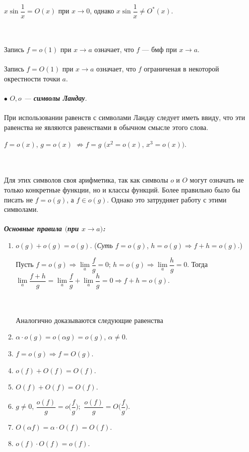 \begin{example}
	$x\sin \dfrac{1}{x} = O(x)$ при $x\to 0$, однако $x\sin \dfrac{1}{x} \ne O^*(x)$.
\end{example}\\\\
Запись $f = o(1)$ при $x\to a$ означает, что $f$ --- бмф при $x\to a$.\\\\
Запись $f = O(1)$ при $x\to a$ означает, что $f$ ограниченая  в некоторой окрестности точки $a$.\\\\
$\bullet$ \textit{$O, o$ --- \textbf{символы Ландау}.}\\\\
При использовании равенств с символами Ландау следует иметь ввиду, что эти равенства не являются равенствами в обычном смысле этого слова.\\
\begin{example}
	$f = o(x)$, $g = o(x)$ $\not \Rightarrow f = g$ $(x^2 = o(x)$, $x^3 = o(x))$.  
\end{example}\\\\
Для этих символов своя арифметика, так как символы $o$ и $O$ могут означать не только конкретные функции, но и классы функций. Более правильно было бы писать не $f= o(g)$, а $f \in o(g)$. Однако это затрудняет работу с этими символами.\\\\
\textbf{\textit{Основные правила $($при $x \to a)$:}}
\begin{enumerate}
	\item $o(g) + o(g) = o(g).$ (\textit{Суть} $f = o(g)$, $h =o (g)\Rightarrow f + h = o(g)$.)
	\begin{Proof}
		Пусть $f = o(g)\Rightarrow \lim\limits_{a}\dfrac{f}{g} = 0$; $h = o(g)\Rightarrow\lim\limits_{a}\dfrac{h}{g}=  0$.
		Тогда $\lim\limits_{a} \dfrac{f + h}{g} = \lim\limits_{a}\dfrac{f}{g} + \lim\limits_{a}\dfrac{h}{g} = 0\Rightarrow f+h = o(g)$.
	\end{Proof}\\\\
	Аналогично доказываются следующие равенства
	\item $\alpha \cdot o(g) = o (\alpha g) = o (g)$, $\alpha \ne 0$.
	\item $f = o(g)\Rightarrow f = O(g)$.
	\item $o(f) + O(f) = O(f)$.
	\item $O(f) + O(f) =  O(f)$.
	\item $g \ne 0$, $\dfrac{o(f)}{g} = o\Big(\dfrac{f}{g}\Big);$ $\dfrac{o(f)}{g} = O\Big(\dfrac{f}{g}\Big)$.
	\item $O(\alpha f) = \alpha\cdot  O(f) = O(f)$.
	\item $o(f) \cdot O(f) = o(f)$.
\end{enumerate}
